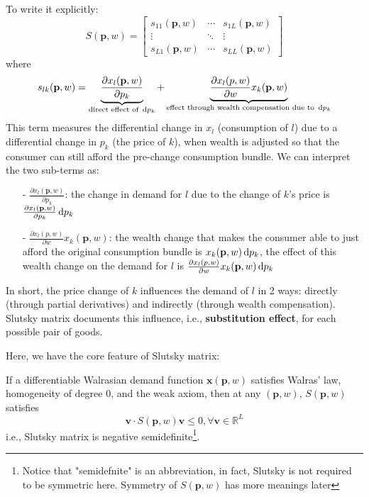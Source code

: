 To write it explicitly:
$$
S(\mathbf{p},w)=
\begin{bmatrix}
    s_{11}(\mathbf{p},w) & \cdots & s_{1L}(\mathbf{p},w)\\
    \vdots & \ddots & \vdots \\
    s_{L1}(\mathbf{p},w) & \cdots & s_{LL}(\mathbf{p},w)
\end{bmatrix}
$$
where $$s_{lk}(\mathbf{p},w)=\underbrace{\frac{\partial x_l(\mathbf{p},w)}{\partial p_k}}_{\text{direct effect of }\mathop{}\!\mathrm{d} p_k} +\underbrace{\frac{\partial x_l (p,w)}{\partial w}x_k(\mathbf{p},w)}_{\text{effect through wealth compensation due to }\mathop{}\!\mathrm{d} p_k}$$
This term measures the differential change in $x_l$ (consumption of $l$) due to a differential change in $p_k$ (the price of $k$), when wealth is adjusted so that the consumer can still afford the pre-change consumption bundle. We can interpret the two sub-terms as:
\begin{enumerate}
    \item[-] $\frac{\partial x_l(\mathbf{p},w)}{\partial p_k}$: the change in demand for $l$ due to the change of $k$'s price is $\frac{\partial x_l(\mathbf{p},w)}{\partial p_k}\mathop{}\!\mathrm{d} p_k$
    \item[-] $\frac{\partial x_l (p,w)}{\partial w}x_k(\mathbf{p},w)$: the wealth change that makes the consumer able to just afford the original consumption bundle is $x_k(\mathbf{p},w)\mathop{}\!\mathrm{d} p_k$, the effect of this wealth change on the demand for $l$ is $\frac{\partial x_l (p,w)}{\partial w}x_k(\mathbf{p},w)\mathop{}\!\mathrm{d} p_k$
\end{enumerate}
In short, the price change of $k$ influences the demand of $l$ in 2 ways: directly (through partial derivatives) and indirectly (through wealth compensation). Slutsky matrix documents this influence, i.e., \textbf{substitution effect}, for each possible pair of goods. 

Here, we have the core feature of Slutsky matrix: 
\begin{theorem}
    If a differentiable Walrasian demand function $\mathbf{x}(\mathbf{p},w)$ satisfies Walras' law, homogeneity of degree 0, and the weak axiom, then at any $(\mathbf{p},w)$, $S(\mathbf{p},w)$ satisfies
    $$\mathbf{v}\cdot S(\mathbf{p},w)\mathbf{v}\leq 0, \forall \mathbf{v}\in\mathbb{R}^L$$
    i.e., Slutsky matrix is negative semidefinite\footnote{Notice that "semidefnite" is an abbreviation, in fact, Slutsky is not required to be symmetric here. Symmetry of $S(\mathbf{p},w)$ has more meanings later}.
\end{theorem}
